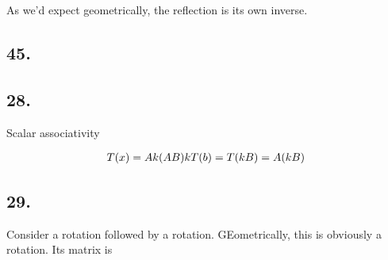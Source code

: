 \documentclass[]{article}
\newcommand{\meq}[1]{\begin{split}#1\end{split}}
\begin{document}
As we'd expect geometrically, the reflection is its own inverse.

\hypertarget{section-85}{%
\subsection{45.}\label{section-85}}

\hypertarget{section-86}{%
\subsection{28.}\label{section-86}}

Scalar associativity

\[T(x) = A
\meq{k(AB)
kT(b)=T(kB)=A(kB)}\\
\]

\hypertarget{section-87}{%
\subsection{29.}\label{section-87}}

Consider a rotation followed by a rotation. GEometrically, this is
obviously a rotation. Its matrix is
\end{document}
